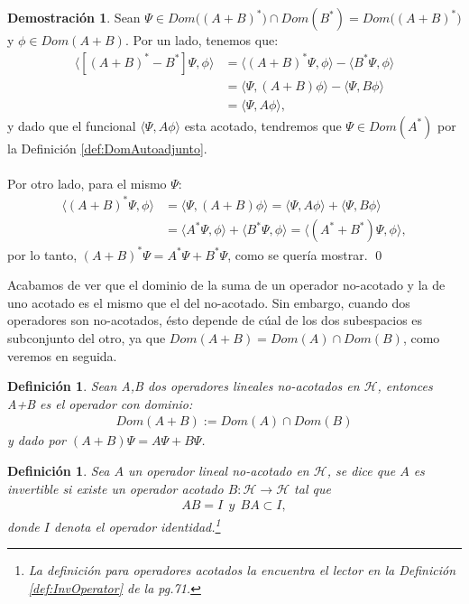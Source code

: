 \documentclass[12pt]{article}
\newtheorem{defn}[teo]{Definición}
\theoremstyle{definition}
\newtheorem*{demo}{Demostración}
\begin{document}
\begin{demo}
    Sean $\Psi\in Dom\big((A+B)^*\big)\cap Dom(B^*) = Dom\big((A+B)^*\big)$ y $\phi \in Dom(A+B)$. Por un lado, tenemos que:
    \begin{align*}
        \langle [(A+B)^*-B^*]\Psi,\phi\rangle & = \langle(A+B)^*\Psi,\phi\rangle - \langle B^*\Psi,\phi\rangle 
        \\ & = 
        \langle\Psi,(A+B)\phi\rangle - \langle\Psi,B\phi\rangle
        \\ & = 
        \langle\Psi,A\phi\rangle,
    \end{align*}
    y dado que el funcional $\langle\Psi,A\phi\rangle$ esta acotado, tendremos que $\Psi\in Dom(A^*)$ por la Definición \ref{def:DomAutoadjunto}. \\\\ Por otro lado, para el mismo $\Psi$:
    \begin{align*}
        \langle (A+B)^{*} \Psi, \phi \rangle
        &
        =
        \langle \Psi, (A+B)\phi \rangle =
        \langle \Psi, A\phi \rangle + \langle \Psi,B\phi \rangle 
        \\
        & =
        \langle A^{*} \Psi , \phi \rangle + \langle B^{*} \Psi, \phi \rangle =
        \langle (A^{*}+B^{*})\Psi, \phi \rangle ,
    \end{align*}
    por lo tanto, $(A+B)^{*}\Psi = A^{*}\Psi + B^{*}\Psi$, como se quería mostrar. 
    \qed
\end{demo}
\noindent
 Acabamos de ver que el dominio de la suma de un operador no-acotado y la de uno acotado es el mismo que el del no-acotado. Sin embargo, cuando dos operadores son no-acotados, ésto depende de cúal de los dos subespacios es subconjunto del otro, ya que $Dom(A+B) = Dom(A)\cap Dom(B)$, como veremos en seguida.
\begin{defn}
    Sean A,B dos operadores lineales no-acotados en $\mathcal{H}$, entonces A+B es el operador con dominio:
    \begin{align*}
        Dom(A+B) := Dom(A)\cap Dom(B)
    \end{align*}
    y dado por $(A+B)\Psi = A\Psi + B\Psi$.
    \label{def:DomOPADJS}
\end{defn}
\begin{defn}
    Sea $A$ un operador lineal no-acotado en $\mathcal{H}$, se dice que $A$ es invertible si existe un operador acotado $B:\mathcal{H} \longrightarrow \mathcal{H}$ tal que 
    \begin{align*}
        AB = I\:\: y \:\:BA \subset I,
    \end{align*}
    donde $I$ denota el operador identidad.\footnote{La definición para operadores acotados la encuentra el lector en la Definición \ref{def:InvOperator} de la pg.71.}
\end{defn}
\end{document}
